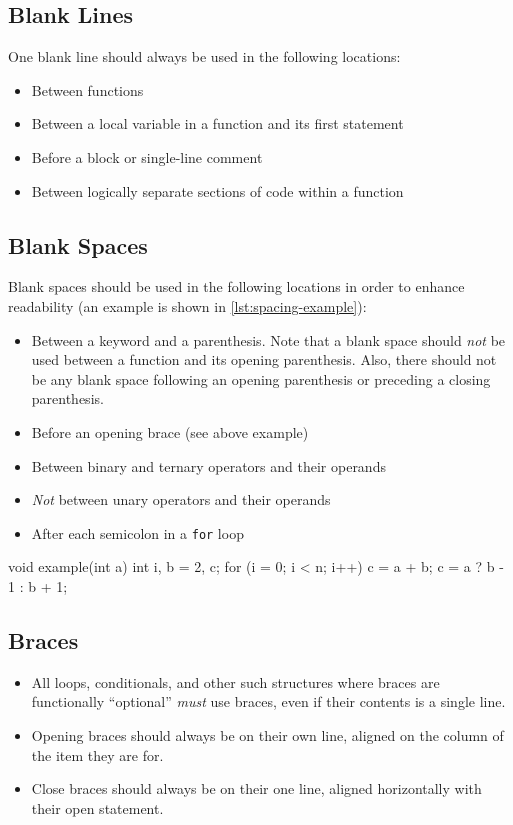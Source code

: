 \documentclass[StyleGuide.tex]{subfiles}
\begin{document}
\subsection{Blank Lines}\label{subsec:blank-lines}

One blank line should always be used in the following locations:

\begin{itemize}
\item
  Between functions
\item
  Between a local variable in a function and its first statement
\item
  Before a block or single-line comment
\item
  Between logically separate sections of code within a function
\end{itemize}

\subsection{Blank Spaces}\label{subsec:blank-spaces}

Blank spaces should be used in the following locations in order to enhance
readability (an example is shown in \autoref{lst:spacing-example}):

\begin{itemize}
\item
  Between a keyword and a parenthesis. Note that a blank space should
  \emph{not} be used between a function and its opening parenthesis. Also,
  there should not be any blank space following an opening parenthesis
  or preceding a closing parenthesis.
\item
  Before an opening brace (see above example)
\item
  Between binary and ternary operators and their operands
\item
  \emph{Not} between unary operators and their operands
\item
  After each semicolon in a \texttt{for} loop
\end{itemize}

\begin{code}[caption=Spacing example, label=lst:spacing-example]
void example(int a) {
	int i, b = 2, c;
	for (i = 0; i < n; i++) {
		c = a + b;
		c = a ? b - 1 : b + 1;
	}
}
\end{code}

\subsection{Braces}\label{subsec:braces}

\begin{itemize}
\item
  All loops, conditionals, and other such structures where braces are
  functionally ``optional'' \emph{must} use braces, even if their
  contents is a single line.
\item
  Opening braces should always be on their own line, aligned on the
  column of the item they are for.
\item
  Close braces should always be on their one line, aligned horizontally
  with their open statement.
\end{itemize}
\end{document}
